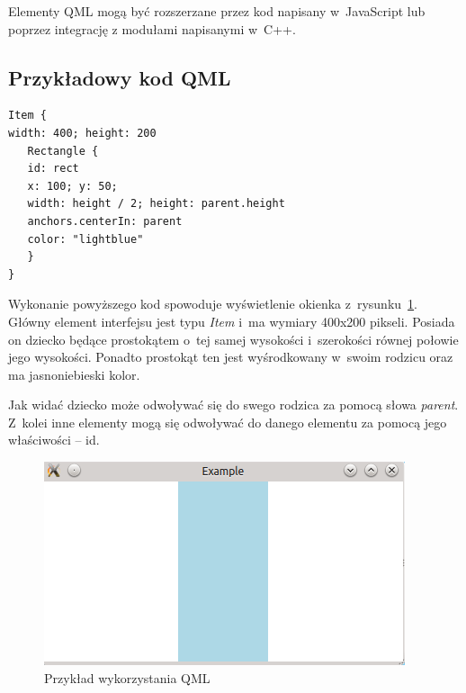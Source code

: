 Elementy QML mogą być rozszerzane przez kod napisany w~JavaScript lub poprzez integrację z modułami napisanymi w~C++.

\subsection{Przykładowy kod QML}

\begin{verbatim}
Item {
width: 400; height: 200
   Rectangle {
   id: rect
   x: 100; y: 50;
   width: height / 2; height: parent.height
   anchors.centerIn: parent
   color: "lightblue"
   }
}
\end{verbatim}

Wykonanie powyższego kod spowoduje wyświetlenie okienka z~rysunku~\ref{rys:qml}. Główny element interfejsu jest typu \textit{Item} i~ma wymiary 400x200 pikseli. Posiada on dziecko będące prostokątem o~tej samej wysokości i~szerokości równej połowie jego wysokości. Ponadto prostokąt ten jest wyśrodkowany w~swoim rodzicu oraz ma jasnoniebieski kolor.

Jak widać dziecko może odwoływać się do swego rodzica za pomocą słowa \textit{parent}. Z~kolei inne elementy mogą się odwoływać do danego elementu za pomocą jego właściwości -- id.

\begin{figure}
\centering
\caption{Przykład wykorzystania QML}\label{rys:qml}
\includegraphics{img/qml.png}
\end{figure}

